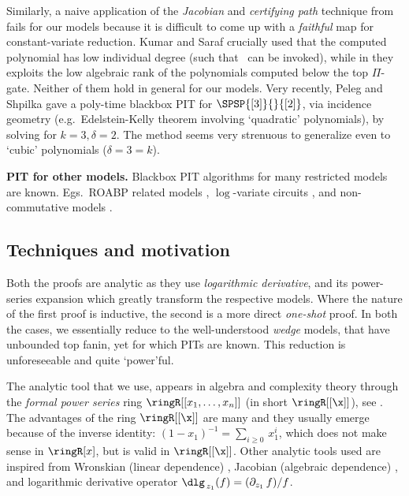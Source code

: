 Similarly, a naive application of the \emph{Jacobian} and \emph{certifying path} technique from \cite{agrawal2016jacobian} fails for our models because it is difficult to come up with a \emph{faithful} map for constant-variate reduction. Kumar and Saraf \cite{DBLP:conf/coco/0001S16a} crucially used that the computed polynomial has low individual degree (such that~\cite{dvir2010hardness} can be invoked), while in \cite{DBLP:journals/toc/0001S17} they exploits the low algebraic rank of the polynomials computed below the top $\Pi$-gate. Neither of them hold in general for our models. Very recently, Peleg and Shpilka \cite{peleg2020polynomial} gave a poly-time blackbox PIT for $\SPSP{[3]}{}{[2]}$, via incidence geometry (e.g.~Edelstein-Kelly theorem involving `quadratic' polynomials), by solving \cite[Conj.~1]{gupta2014algebraic} for $k=3,\delta=2$. The method seems very strenuous to generalize even to `cubic' polynomials ($\delta=3=k$). 

\textbf{PIT for other models. } Blackbox PIT algorithms for many restricted models are known. Egs.~ROABP related models \cite{raz2005deterministic,jansen2010deterministic, agrawal2015hitting,gurjarARO,gurjar2017deterministic,forbes2014hitting,anderson2018identity}, $\log$-variate circuits \cite{forbes2018towards,bisht2020poly}, and non-commutative models \cite{garg2016deterministic,DBLP:journals/cjtcs/LagardeMP19}.

\subsection{Techniques and motivation}\label{sec:pf-ideas}

Both the proofs are analytic as they use \emph{logarithmic derivative}, and its power-series expansion which greatly transform the respective models. Where the nature of the first proof is inductive, the second is a more direct \emph{one-shot} proof. In both the cases, we essentially reduce to the well-understood \emph{wedge} models, that have unbounded top fanin, yet for which PITs are known. This reduction is unforeseeable and quite `power'ful.  

The analytic tool that we use, appears in algebra and complexity theory through the \emph{formal power series} ring $\ringR[[x_1,\hdots,x_n]]$ (in short $\ringR[[\x]]$), see \cite{10.2307/2317940,sinhababu2019power,dutta2018discovering}. The advantages of the ring $\ringR[[\x]]$ are many and they usually emerge because of the inverse identity: $(1 - x_1)^{-1} = \sum_{i \ge 0}\, x_1^i$, which does not make sense in $\ringR[x]$, but is valid in $\ringR[[\x]]$. Other analytic tools used are inspired from Wronskian (linear dependence) \cite[Theorem~7]{koiran2015wronskian} \cite{kayal2015lower}, Jacobian (algebraic dependence) \cite{beecken2013algebraic, agrawal2016jacobian,pandey2018algebraic}, and logarithmic derivative operator $\dlg_{\,z_1}(f) = (\partial_{z_1}\,f)/f$.

